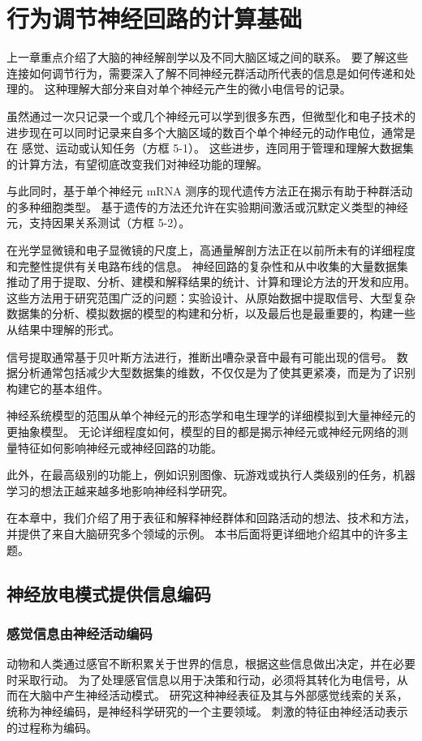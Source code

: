 \chapter{行为调节神经回路的计算基础} \label{chap:chap5}
上一章重点介绍了大脑的神经解剖学以及不同大脑区域之间的联系。 
要了解这些连接如何调节行为，需要深入了解不同神经元群活动所代表的信息是如何传递和处理的。 
这种理解大部分来自对单个神经元产生的微小电信号的记录。

虽然通过一次只记录一个或几个神经元可以学到很多东西，但微型化和电子技术的进步现在可以同时记录来自多个大脑区域的数百个单个神经元的动作电位，通常是在 感觉、运动或认知任务（方框 5-1）。 
这些进步，连同用于管理和理解大数据集的计算方法，有望彻底改变我们对神经功能的理解。


与此同时，基于单个神经元 mRNA 测序的现代遗传方法正在揭示有助于种群活动的多种细胞类型。 
基于遗传的方法还允许在实验期间激活或沉默定义类型的神经元，支持因果关系测试（方框 5-2）。


在光学显微镜和电子显微镜的尺度上，高通量解剖方法正在以前所未有的详细程度和完整性提供有关电路布线的信息。 
神经回路的复杂性和从中收集的大量数据集推动了用于提取、分析、建模和解释结果的统计、计算和理论方法的开发和应用。 
这些方法用于研究范围广泛的问题：实验设计、从原始数据中提取信号、大型复杂数据集的分析、模拟数据的模型的构建和分析，以及最后也是最重要的，构建一些 从结果中理解的形式。


信号提取通常基于贝叶斯方法进行，推断出嘈杂录音中最有可能出现的信号。 
数据分析通常包括减少大型数据集的维数，不仅仅是为了使其更紧凑，而是为了识别构建它的基本组件。


神经系统模型的范围从单个神经元的形态学和电生理学的详细模拟到大量神经元的更抽象模型。 
无论详细程度如何，模型的目的都是揭示神经元或神经元网络的测量特征如何影响神经元或神经回路的功能。

此外，在最高级别的功能上，例如识别图像、玩游戏或执行人类级别的任务，机器学习的想法正越来越多地影响神经科学研究。


在本章中，我们介绍了用于表征和解释神经群体和回路活动的想法、技术和方法，并提供了来自大脑研究多个领域的示例。 
本书后面将更详细地介绍其中的许多主题。


\section{神经放电模式提供信息编码}

\subsection{感觉信息由神经活动编码}
动物和人类通过感官不断积累关于世界的信息，根据这些信息做出决定，并在必要时采取行动。 
为了处理感官信息以用于决策和行动，必须将其转化为电信号，从而在大脑中产生神经活动模式。 
研究这种神经表征及其与外部感觉线索的关系，统称为神经编码，是神经科学研究的一个主要领域。 
刺激的特征由神经活动表示的过程称为编码。


